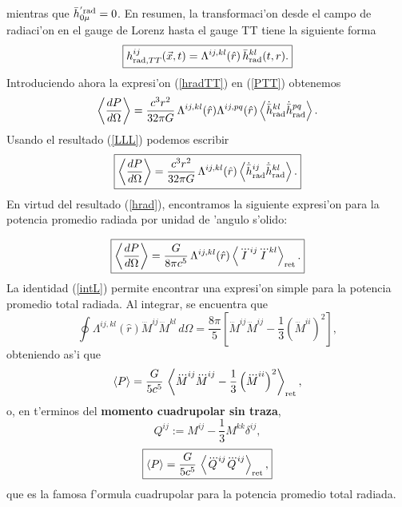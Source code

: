 mientras que $\bar{h}^{'\rm rad}_{0\mu}=0$. En resumen, la transformaci'on desde el campo de radiaci'on en el gauge de Lorenz hasta el gauge TT tiene la siguiente forma
\begin{equation}\label{hradTT}
\boxed{h_{{\rm rad}, TT}^{ij}(\vec{x},t)= \Lambda^{ij,kl}(\hat{r})\,\bar{h}_{\rm rad}^{kl}(t,r).}
\end{equation}
Introduciendo ahora la expresi'on (\ref{hradTT})  en  (\ref{PTT}) obtenemos
\begin{equation}\label{PGL}
\left\langle\frac{d P}{d\Omega}\right\rangle=\frac{c^3r^2}{32\pi G}\, \Lambda^{ij,kl}(\hat{r})\Lambda^{ij,pq}(\hat{r})\left\langle\dot{\bar{h}}_{\rm rad}^{kl}\dot{\bar{h}}_{\rm rad}^{pq}\right\rangle.
\end{equation}
Usando el resultado (\ref{LLL}) podemos escribir
\begin{equation}\label{PGL2}
\boxed{\left\langle\frac{d P}{d\Omega}\right\rangle=\frac{c^3r^2}{32\pi G}\, \Lambda^{ij,kl}(\hat{r})\left\langle\dot{\bar{h}}_{\rm rad}^{ij}\dot{\bar{h}}_{\rm rad}^{kl}
\right\rangle.}
\end{equation}
En virtud del resultado (\ref{hrad}), encontramos la siguiente expresi'on para la potencia promedio radiada por unidad de 'angulo s'olido:

\begin{equation}\label{PGL3}
\boxed{\left\langle\frac{d P}{d\Omega}\right\rangle=\frac{G}{8\pi c^5}\, \Lambda^{ij,kl}(\hat{r})\left\langle\dddot{I}^{ij}\dddot{I}^{kl}\right\rangle_{\rm ret} .}
\end{equation}
La identidad (\ref{intL}) permite encontrar una expresi'on simple para la potencia promedio total radiada. Al integrar, se encuentra que
\begin{equation}\label{intLII}
\oint\Lambda^{ij,kl}(\hat{r})\dddot{M}^{ij}
\dddot{M}^{kl}\,d\Omega=\frac{8\pi}{5}\left[\dddot{M}^{ij}\dddot{M}^{ij}-\frac{1}{3}(\dddot{M}^{ii})^2\right],
\end{equation}
obteniendo as'i que
\begin{equation}\label{PII}
\left\langle P\right\rangle =\frac{G}{5c^5}\, \left\langle \dddot{M}^{ij}\dddot{M}^{ij}-\frac{1}{3}\left(\dddot{M}^{ii}\right)^2\right\rangle_{\rm ret},
\end{equation}
o, en t'erminos del \textbf{momento cuadrupolar sin traza},
\begin{equation}\label{Qij}
Q^{ij}:=M^{ij}-\frac{1}{3}M^{kk}\delta^{ij},
\end{equation}
\begin{equation}\label{PTTQ}
\boxed{\left\langle P\right\rangle=\frac{G}{5c^5}\, \left\langle \dddot{Q}^{ij}\dddot{Q}^{ij}\right\rangle_{\rm ret} ,}
\end{equation}
que es la famosa f'ormula cuadrupolar para la potencia promedio total radiada.


